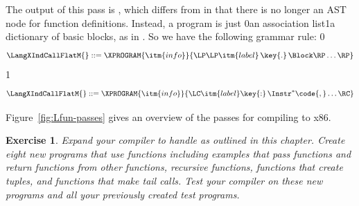 \documentclass[7x10]{TimesAPriori_MIT}%
\def\racketEd{0}
\def\pythonEd{1}
\def\edition{1}
\newcommand{\racket}[1]{{\if\edition\racketEd{#1}\fi}}
\newcommand{\pythonColor}[0]{}
\newcommand{\python}[1]{{\if\edition\pythonEd\pythonColor #1\fi}}
\newtheorem{exercise}[theorem]{Exercise}
\numberwithin{theorem}{chapter}
\numberwithin{definition}{chapter}
\numberwithin{equation}{chapter}
\begin{document}
The output of this pass is \LangXIndCallFlat{}, which differs from
\LangXIndCall{} in that there is no longer an AST node for function
definitions. Instead, a program is just
\racket{an association list}\python{a dictionary}
of basic blocks, as in \LangXGlobal{}. So we have the following grammar rule:
{\if\edition\racketEd
\[
\LangXIndCallFlatM{} ::= \XPROGRAM{\itm{info}}{\LP\LP\itm{label} \,\key{.}\, \Block \RP\ldots\RP}
\]
\fi}
{\if\edition\pythonEd
\[
\LangXIndCallFlatM{} ::= \XPROGRAM{\itm{info}}{\LC\itm{label}\key{:}\,\Instr^{*}\code{,}\ldots\RC}
\]
\fi}

Figure~\ref{fig:Lfun-passes} gives an overview of the passes for
compiling \LangFun{} to x86.

\begin{exercise}\normalfont\normalsize
Expand your compiler to handle \LangFun{} as outlined in this chapter.
Create eight new programs that use functions including examples that
pass functions and return functions from other functions, recursive
functions, functions that create tuples, and functions that make tail
calls. Test your compiler on these new programs and all your
previously created test programs.
\end{exercise}
\end{document}
